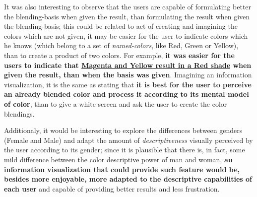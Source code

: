%
It was also interesting to observe that the users are capable of formulating better the blending-basis when given the result, than formulating the result
when given the blending-basis; this could be related to act of creating and imagining the colors which are not given, it may be easier for the user to
indicate colors which he knows (which belong to a set of \emph{named-colors}, like Red, Green or Yellow), than to create a product of two colors. For
example, \textbf{it was easier for the users to indicate that \ul{Magenta and Yellow result in a Red shade} when given the result, than when the basis
was given}. Imagining an information visualization, it is the same as stating that \textbf{it is best for the user to perceive an already blended color
and process it according to its mental model of color}, than to give a white screen and ask the user to create the color blendings. \par
%
Additionaly, it would be interesting to explore the differences between genders (Female and Male) and adapt the amount of \emph{descriptiveness} visually
perceived by the user according to its gender; since it is plausible that there is, in fact, some mild difference between the color descriptive power of
man and woman, \textbf{an information visualization that could provide such feature would be, besides more enjoyable, more adapted to the descriptive
capabilities of each user} and capable of providing better results and less frustration.
%
